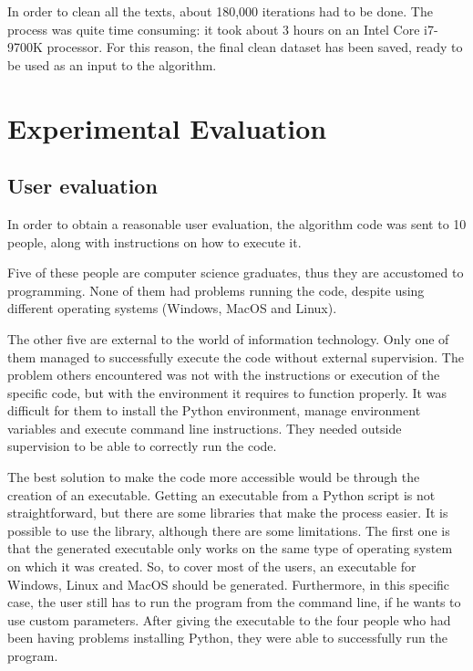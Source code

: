In order to clean all the texts, about 180,000 iterations had to be done. The process was quite time consuming: it took about 3 hours on an Intel Core i7-9700K processor. For this reason, the final clean dataset has been saved, ready to be used as an input to the algorithm.


\section{Experimental Evaluation}\label{sect_exp_eval}

\subsection*{User evaluation}
In order to obtain a reasonable user evaluation, the algorithm code was sent to 10 people, along with instructions on how to execute it.

Five of these people are computer science graduates, thus they are accustomed to programming. None of them had problems running the code, despite using different operating systems (Windows, MacOS and Linux).

The other five are external to the world of information technology. Only one of them managed to successfully execute the code without external supervision. The problem others encountered was not with the instructions or execution of the specific code, but with the environment it requires to function properly. It was difficult for them to install the Python environment, manage environment variables and execute command line instructions. They needed outside supervision to be able to correctly run the code.

The best solution to make the code more accessible would be through the creation of an executable. Getting an executable from a  Python script is not straightforward, but there are some libraries that make the process easier. It is possible to use the  library, although there are some limitations. The first one is that the generated executable only works on the same type of operating system on which it was created. So, to cover most of the users, an executable for Windows, Linux and MacOS should be generated. Furthermore, in this specific case, the user still has to run the program from the command line, if he wants to use custom parameters. After giving the executable to the four people who had been having problems installing Python, they were able to successfully run the program.

